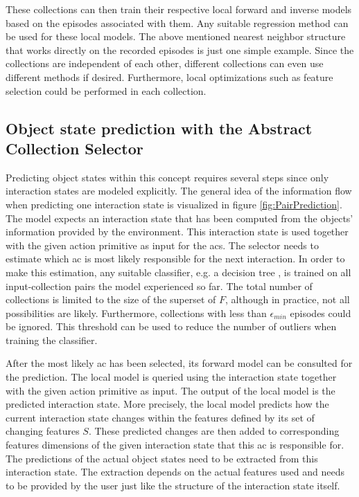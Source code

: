 These collections can then train their respective local forward and inverse models based on the episodes associated with them. Any suitable regression method can be used for these local models. The above mentioned nearest neighbor structure that works directly on the recorded episodes is just one simple example. Since the collections are independent of each other, different collections can even use different methods if desired. Furthermore, local optimizations such as feature selection could be performed in each collection. 

\subsection{Object state prediction with the Abstract Collection Selector \label{sec:pairPrediction}}

Predicting object states within this concept requires several steps since only interaction states are modeled explicitly. The general idea of the information flow when predicting one interaction state is visualized in figure \ref{fig:PairPrediction}. The model expects an interaction state that has been computed from the objects' information provided by the environment. This interaction state is used together with the given action primitive as input for the \acrfull{acs}. The selector needs to estimate which \gls{ac} is most likely responsible for the next interaction. In order to make this estimation, any suitable classifier, e.g. a decision tree \cite{decisionTree}, is trained on all input-collection pairs the model experienced so far. 
The total number of collections is limited to the size of the superset of $F$, although in practice, not all possibilities are likely. Furthermore, collections with less than $\epsilon_{min}$ episodes could be ignored. This threshold can be used to reduce the number of outliers when training the classifier. 

After the most likely \gls{ac} has been selected, its forward model can be consulted for the prediction. The local model is queried using the interaction state together with the given action primitive as input. The output of the local model is the predicted interaction state. 
More precisely, the local model predicts how the current interaction state changes within the features defined by its set of changing features $S$.
These predicted changes are then added to corresponding features dimensions of the given interaction state that this \gls{ac} is responsible for.
The predictions of the actual object states need to be extracted from this interaction state. The extraction depends on the actual features used and needs to be provided by the user just like the structure of the interaction state itself.

